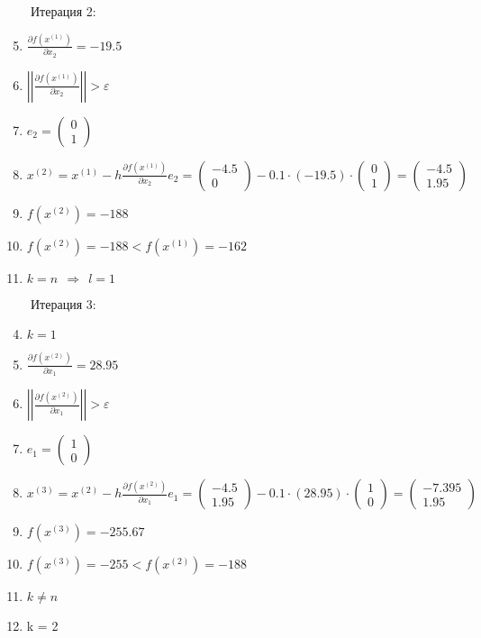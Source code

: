 \documentclass{article}
\begin{document}
\ \ \ \ Итерация 2:

\begin{enumerate}
    \setcounter{enumi}{4}
    \item $\frac{\partial f(x^{(1)})}{\partial x_2} = -19.5$
    \item $\left|\left|\frac{\partial f(x^{(1)})}{\partial x_2}\right|\right| > \varepsilon$
    \item $e_{2} = \begin{pmatrix} 0 \\ 1 \end{pmatrix}$
    \item $x^{(2)} = x^{(1)} - h \frac{\partial f(x^{(1)})}{\partial x_2} e_2 = 
        \begin{pmatrix} -4.5 \\ 0 \end{pmatrix} - 0.1 \cdot (-19.5) \cdot \begin{pmatrix} 0 \\ 1 \end{pmatrix} = 
        \begin{pmatrix} -4.5 \\ 1.95 \end{pmatrix}$
    \item $f(x^{(2)}) = -188$
    \item $f(x^{(2)}) = -188 < f(x^{(1)}) = -162$
    \item $k = n \ \ \Rightarrow \ \ l = 1$
\end{enumerate}

\ \ \ \ Итерация 3:

\begin{enumerate}
    \setcounter{enumi}{3}
    \item $k = 1$
    \item $\frac{\partial f(x^{(2)})}{\partial x_1} = 28.95$
    \item $\left|\left|\frac{\partial f(x^{(2)})}{\partial x_1}\right|\right| > \varepsilon$
    \item $e_{1} = \begin{pmatrix} 1 \\ 0 \end{pmatrix}$
    \item $x^{(3)} = x^{(2)} - h \frac{\partial f(x^{(2)})}{\partial x_1} e_1 = 
        \begin{pmatrix} -4.5 \\ 1.95 \end{pmatrix} - 0.1 \cdot (28.95) \cdot \begin{pmatrix} 1 \\ 0 \end{pmatrix} = 
        \begin{pmatrix} -7.395 \\ 1.95 \end{pmatrix}$
    \item $f(x^{(3)}) = -255.67$
    \item $f(x^{(3)}) = -255 < f(x^{(2)}) = -188$
    \item $k \ne n$
    \item k = 2
\end{enumerate}
\end{document}
